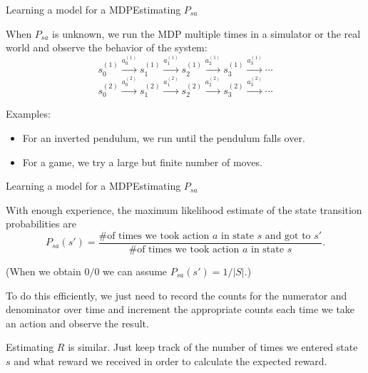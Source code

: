 \documentclass{beamer}
\begin{document}
\begin{frame}{Learning a model for a MDP}{Estimating $P_{sa}$}

  When $P_{sa}$ is unknown, we run the MDP multiple times in a
  simulator or the real world and observe the behavior of the system:
  \[ s_0^{(1)} \stackrel{a_0^{(1)}}{\rightarrow}
  s_1^{(1)} \stackrel{a_1^{(1)}}{\rightarrow}
  s_2^{(1)} \stackrel{a_2^{(1)}}{\rightarrow}
  s_3^{(1)} \stackrel{a_3^{(1)}}{\rightarrow} \cdots \]
  \[ s_0^{(2)} \stackrel{a_0^{(2)}}{\rightarrow}
  s_1^{(2)} \stackrel{a_1^{(2)}}{\rightarrow}
  s_2^{(2)} \stackrel{a_2^{(2)}}{\rightarrow}
  s_3^{(2)} \stackrel{a_3^{(2)}}{\rightarrow} \cdots \]

  Examples:
  \begin{itemize}
  \item For an inverted pendulum, we run until the pendulum falls over.
  \item For a game, we try a large but finite number of moves.
  \end{itemize}

\end{frame}


\begin{frame}{Learning a model for a MDP}{Estimating $P_{sa}$}

  \alert{With enough experience}, the maximum likelihood estimate of
  the state transition probabilities are
  \[ P_{sa}(s') = \frac{\text{\# of times we took action $a$ in state $s$ and got to $s'$}}{\text{\# of times we took action $a$ in state $s$}} .\]

  (When we obtain $0/0$ we can assume $P_{sa}(s') = 1/|S|$.)

  \medskip

  To do this efficiently, we just need to record the counts for the
  numerator and denominator over time and increment the appropriate
  counts each time we take an action and observe the result.

  \medskip

  Estimating $R$ is similar. Just keep track of the number of times we
  entered state $s$ and what reward we received in order to calculate
  the expected reward.
  
\end{frame}
\end{document}

